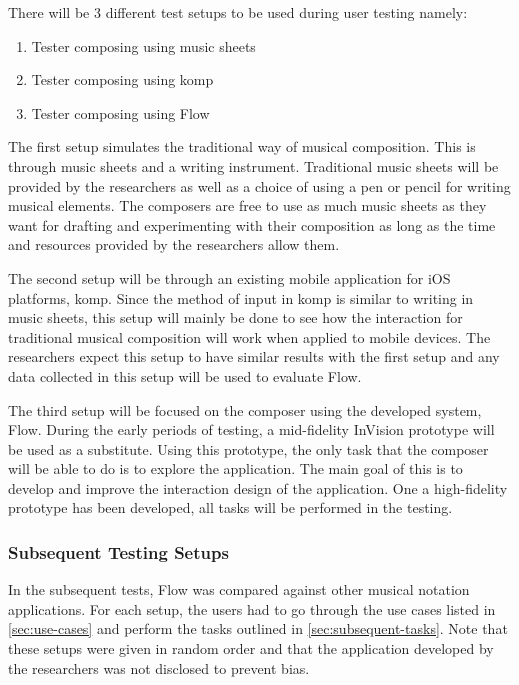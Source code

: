 There will be 3 different test setups to be used during user testing namely:

\begin{enumerate}
\item Tester composing using music sheets
\item Tester composing using komp
\item Tester composing using Flow
\end{enumerate}

The first setup simulates the traditional way of musical composition. This is through music sheets and a writing instrument. Traditional music sheets will be provided by the researchers as well as a choice of using a pen or pencil for writing musical elements. The composers are free to use as much music sheets as they want for drafting and experimenting with their composition as long as the time and resources provided by the researchers allow them.

The second setup will be through an existing mobile application for iOS platforms, komp. Since the method of input in komp is similar to writing in music sheets, this setup will mainly be done to see how the interaction for traditional musical composition will work when applied to mobile devices. The researchers expect this setup to have similar results with the first setup and any data collected in this setup will be used to evaluate Flow.

The third setup will be focused on the composer using the developed system, Flow. During the early periods of testing, a mid-fidelity InVision prototype will be used as a substitute. Using this prototype, the only task that the composer will be able to do is to explore the application. The main goal of this is to develop and improve the interaction design of the application. One a high-fidelity prototype has been developed, all tasks will be performed in the testing.

\subsubsection{Subsequent Testing Setups}

In the subsequent tests, Flow was compared against other musical notation applications. For each setup, the users had to go through the use cases listed in \ref{sec:use-cases} and perform the tasks outlined in \ref{sec:subsequent-tasks}. Note that these setups were given in random order and that the application developed by the researchers was not disclosed to prevent bias.

